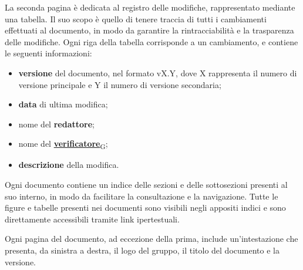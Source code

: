 La seconda pagina è dedicata al registro delle modifiche, rappresentato mediante una tabella. Il suo scopo è quello di tenere traccia di tutti i cambiamenti effettuati al documento,
in modo da garantire la rintracciabilità e la trasparenza delle modifiche. Ogni riga della tabella corrisponde a un cambiamento, e contiene le seguenti informazioni:
\begin{itemize}
	\item \textbf{versione} del documento, nel formato vX.Y, dove X rappresenta il numero di versione principale e Y il numero di versione secondaria;
	\item \textbf{data} di ultima modifica;
	\item nome del \textbf{redattore};
	\item nome del \href{https://7last.github.io/docs/rtb/documentazione-interna/glossario\#verificatore}{\textbf{verificatore}\textsubscript{G}};
	\item \textbf{descrizione} della modifica.
\end{itemize}

Ogni documento contiene un indice delle sezioni e delle sottosezioni presenti al suo interno, in modo da facilitare la consultazione e la navigazione.
Tutte le figure e tabelle presenti nei documenti sono visibili negli appositi indici e sono direttamente accessibili tramite link ipertestuali.

Ogni pagina del documento, ad eccezione della prima, include un'intestazione che presenta, da sinistra a destra, il logo del gruppo, il titolo del documento e la versione.

